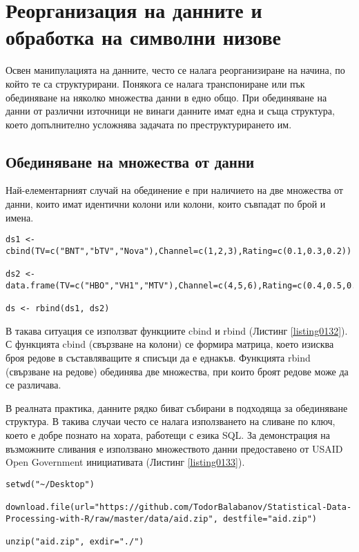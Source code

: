 \newpage
\chapter{Реорганизация на данните и обработка на символни низове}
\label{chapter07}

Освен манипулацията на данните, често се налага реорганизиране на начина, по който те са структурирани. Понякога се налага транспониране или пък обединяване на няколко множества данни в едно общо. При обединяване на данни от различни източници не винаги данните имат една и съща структура, което допълнително усложнява задачата по преструктурирането им.

\section{Обединяване на множества от данни}

Най-елементарният случай на обединение е при наличието на две множества от данни, които имат идентични колони или колони, които съвпадат по брой и имена.

\begin{lstlisting}[caption=Обединяване на множества от данни, label=listing0132]
ds1 <- cbind(TV=c("BNT","bTV","Nova"),Channel=c(1,2,3),Rating=c(0.1,0.3,0.2))

ds2 <- data.frame(TV=c("HBO","VH1","MTV"),Channel=c(4,5,6),Rating=c(0.4,0.5,0.6),stringsAsFactors=FALSE)

ds <- rbind(ds1, ds2)
\end{lstlisting}

В такава ситуация се използват функциите cbind и rbind (Листинг \ref{listing0132}). С функцията cbind (свързване на колони) се формира матрица, което изисква броя редове в съставляващите я списъци да е еднакъв. Функцията rbind (свързване на редове) обединява две множества, при които броят редове може да се различава.

В реалната практика, данните рядко биват събирани в подходяща за обединяване структура. В такива случаи често се налага използването на сливане по ключ, което е добре познато на хората, работещи с езика SQL. За демонстрация на възможните сливания е използвано множеството данни предоставено от USAID Open Government инициативата (Листинг \ref{listing0133}).

\begin{lstlisting}[caption=USAID множество от данни, label=listing0133]
setwd("~/Desktop")

download.file(url="https://github.com/TodorBalabanov/Statistical-Data-Processing-with-R/raw/master/data/aid.zip", destfile="aid.zip")

unzip("aid.zip", exdir="./")
\end{lstlisting}

